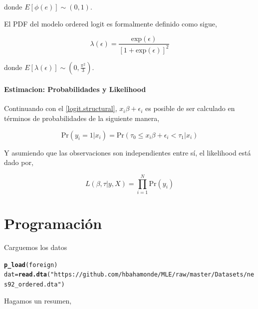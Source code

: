 \documentclass[onesided]{article}\usepackage[]{graphicx}\usepackage[]{color}
\makeatletter
\newcommand{\hlstr}[1]{\textcolor[rgb]{0.192,0.494,0.8}{#1}}%
\newcommand{\hlstd}[1]{\textcolor[rgb]{0.345,0.345,0.345}{#1}}%
\newcommand{\hlkwb}[1]{\textcolor[rgb]{0.69,0.353,0.396}{#1}}%
\newcommand{\hlkwd}[1]{\textcolor[rgb]{0.737,0.353,0.396}{\textbf{#1}}}%
\newenvironment{kframe}{%
 \def\at@end@of@kframe{}%
 \ifinner\ifhmode%
  \def\at@end@of@kframe{\end{minipage}}%
  \begin{minipage}{\columnwidth}%
 \fi\fi%
 \def\FrameCommand##1{\hskip\@totalleftmargin \hskip-\fboxsep
 \colorbox{shadecolor}{##1}\hskip-\fboxsep
     \hskip-\linewidth \hskip-\@totalleftmargin \hskip\columnwidth}%
 \MakeFramed {\advance\hsize-\width
   \@totalleftmargin\z@ \linewidth\hsize
   \@setminipage}}%
 {\par\unskip\endMakeFramed%
 \at@end@of@kframe}
\newenvironment{knitrout}{}{} %
\makeatother
\begin{document}
donde $E[\phi(e)]\sim (0,1)$.

El PDF del modelo ordered logit es formalmente definido como sigue,

\begin{equation}%
\lambda(\epsilon) = \frac{\text{exp}(\epsilon)}{[1+\text{exp}(\epsilon)]^{2}}
\end{equation}

donde $E[\lambda(\epsilon)]\sim(0, \frac{\pi^{2}}{3})$.

\paragraph{Estimacion: Probabilidades y Likelihood} Continuando con el \autoref{logit.structural}, $x_{i}\beta + \epsilon_{i}$ es posible de ser calculado en t\'erminos de probabilidades de la siguiente manera,


\begin{equation}%
\text{Pr}(y_{i}=1|x_{i}) = \text{Pr}(\tau_{0} \leq x_{i}\beta + \epsilon_{i} < \tau_{1}|x_{i})
\end{equation}

Y asumiendo que las observaciones son independientes entre s\'i, el likelihood est\'a dado por,

\begin{equation}%
L(\beta,\tau|y, X) = \prod_{i=1}^{N}\text{Pr}(y_{i})
\end{equation}

\section{Programaci\'on}

Carguemos los datos
\begin{knitrout}
\color{fgcolor}\begin{kframe}
\begin{alltt}
\hlkwd{p_load}\hlstd{(foreign)}
\hlstd{dat} \hlkwb{=} \hlkwd{read.dta}\hlstd{(}\hlstr{"https://github.com/hbahamonde/MLE/raw/master/Datasets/nes92_ordered.dta"}\hlstd{)}
\end{alltt}
\end{kframe}
\end{knitrout}

Hagamos un resumen,
\end{document}
